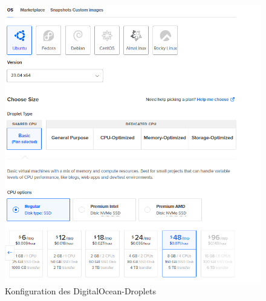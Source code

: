 \begin{figure}[H]
	\centering	
	\includegraphics[scale=0.4]{media/config}
	\caption{Konfiguration des DigitalOcean-Droplets}
	\label{fig:digOcean}
\end{figure}

